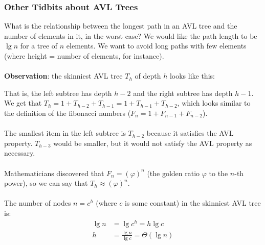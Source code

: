 \documentclass[]{article}
\theoremstyle{definition}
\begin{document}
			\subsubsection{Other Tidbits about AVL Trees}
				What is the relationship between the longest path in an AVL tree and the number of elements in it, in the worst case? We would like the path length to be $\lg n$ for a tree of $n$ elements. We want to avoid long paths with few elements (where height = number of elements, for instance).
				\\ \\
				\textbf{Observation}: the skinniest AVL tree $T_h$ of depth $h$ looks like this:
				\begin{figure}[H]
				\end{figure}
				That is, the left subtree has depth $h - 2$ and the right subtree has depth $h - 1$. We get that $T_h = 1 + T_{h - 2} + T_{h - 1} = 1 + T_{h - 1} + T_{h - 2}$, which looks similar to the definition of the fibonacci numbers ($F_n = 1 + F_{n - 1} + F_{n - 2}$).
				\\ \\
				The smallest item in the left subtree is $T_{h - 2}$ because it satisfies the AVL property. $T_{h - 3}$ would be smaller, but it would not satisfy the AVL property as necessary.
				\\ \\
				Mathematicians discovered that $F_n = (\varphi)^n$ (the golden ratio $\varphi$ to the $n$-th power), so we can say that $T_h \approx (\varphi)^n$.
				\\ \\
				The number of nodes $n = c^h$ (where $c$ is some constant) in the skinniest AVL tree is:
				\begin{align*}
					\lg n &= \lg c^h = h \lg c \\
					h &= \frac{\lg n}{\lg c} = \Theta(\lg n)
				\end{align*}
\end{document}
